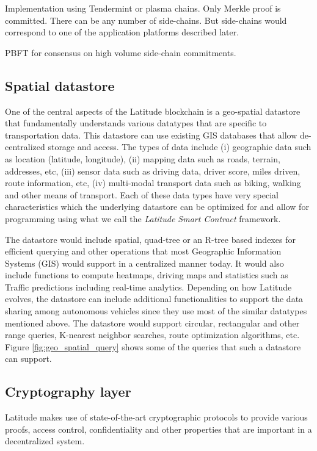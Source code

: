 Implementation using Tendermint or plasma chains. Only Merkle proof is
committed. There can be any number of side-chains. But side-chains would correspond to one of the application platforms
described later.

PBFT for consensus on high volume side-chain commitments.

\subsection{Spatial datastore}
One of the central aspects of the Latitude blockchain is a geo-spatial datastore that fundamentally understands various
datatypes that are specific to transportation data. This datastore can use existing GIS databases that allow
de-centralized storage and access. The types of data include (i) geographic data such as location (latitude, longitude),
(ii) mapping data such as roads, terrain, addresses, etc, (iii) sensor data such as driving data, driver score, miles
driven, route information, etc, (iv) multi-modal transport data such as biking, walking and other means of transport.
Each of these data types have very special characteristics which the underlying datastore can be optimized for and allow
for programming using what we call the {\em Latitude Smart Contract} framework. 

The datastore would include spatial, quad-tree or an R-tree based indexes for efficient querying and other operations that
most Geographic Information Systems (GIS) would support in a centralized manner today. It would also include functions
to compute heatmaps, driving maps and statistics such as Traffic predictions including real-time analytics. Depending on
how Latitude evolves, the datastore can include additional functionalities to support the data sharing among autonomous
vehicles since they use most of the similar datatypes mentioned above. The datastore would support circular, rectangular
and other range queries, K-nearest neighbor searches, route optimization algorithms, etc. Figure
\ref{fig:geo_spatial_query} shows some of the queries that such a datastore can support.


\subsection{Cryptography layer} \label{sec:crypto} Latitude makes use of state-of-the-art cryptographic protocols to
provide various proofs, access control, confidentiality and other properties that are important in a decentralized
system.

